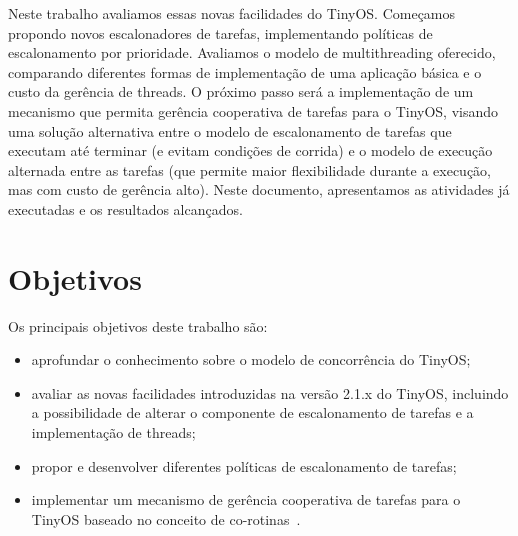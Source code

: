\documentclass[a4paper,onecolumn, 10pt]{article}
\begin{document}
Neste trabalho avaliamos essas novas facilidades do TinyOS.
Começamos propondo novos escalonadores de tarefas, implementando políticas de escalonamento por
prioridade. Avaliamos o modelo de multithreading oferecido, comparando diferentes formas de implementação
de uma aplicação básica e o custo da gerência de threads. O próximo passo será a implementação
de um mecanismo que permita gerência cooperativa de tarefas para o TinyOS, visando 
uma solução alternativa entre o modelo de escalonamento de tarefas que executam até terminar 
(e evitam condições de corrida) e o modelo de execução alternada entre as tarefas 
(que permite maior flexibilidade durante a execução, mas com custo de gerência alto).
Neste documento, apresentamos as atividades já executadas e os resultados alcançados.

\section{Objetivos}\label{objetivos}
Os principais objetivos deste trabalho são:
\begin{itemize}
\item aprofundar o conhecimento sobre o modelo de concorrência do TinyOS;
\item avaliar as novas facilidades introduzidas na versão 2.1.x do TinyOS, 
incluindo a possibilidade de alterar o componente de escalonamento de tarefas e a implementação de threads;
\item propor e desenvolver diferentes políticas de escalonamento de tarefas;
\item implementar um mecanismo de gerência cooperativa de tarefas para o TinyOS baseado no 
conceito de co-rotinas~\cite{Rossetto/06}.
\end{itemize}

\end{document}
